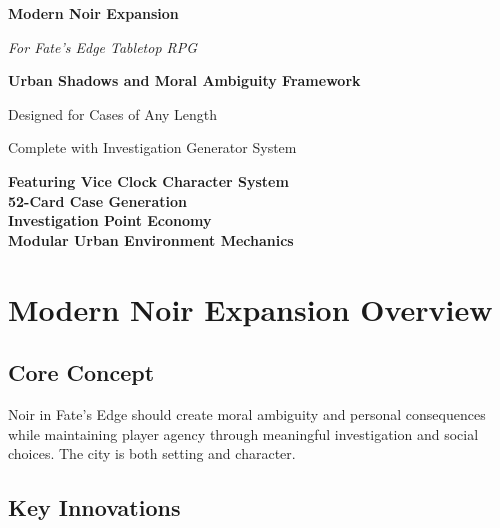\documentclass[11pt]{article}
\begin{document}
\begin{titlepage}
\centering
\vspace*{2cm}

{\Huge\bfseries\color{headercolor} Modern Noir Expansion} 

\vspace{0.5cm}

{\Large\itshape For Fate's Edge Tabletop RPG}

\vspace{2cm}

\vspace{2cm}

{\Large\bfseries Urban Shadows and Moral Ambiguity Framework}

\vspace{1cm}

{\large Designed for Cases of Any Length}

\vspace{1cm}

{\large Complete with Investigation Generator System}

\vfill

{\large 
\textbf{Featuring Vice Clock Character System} \\
\textbf{52-Card Case Generation} \\
\textbf{Investigation Point Economy} \\
\textbf{Modular Urban Environment Mechanics}
}

\end{titlepage}

\newpage

\tableofcontents

\newpage

\section{Modern Noir Expansion Overview}

\subsection{Core Concept}

Noir in Fate's Edge should create moral ambiguity and personal consequences while maintaining player agency through meaningful investigation and social choices. The city is both setting and character.

\subsection{Key Innovations}
\end{document}
